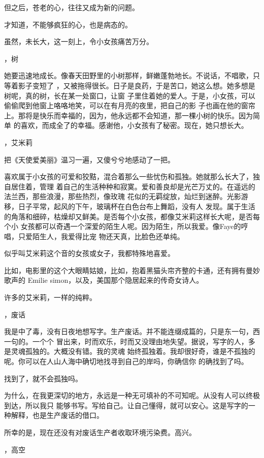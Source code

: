 \documentclass[12pt,a4paper]{article}
\newcommand{\subpart}[1]{
	\begingroup \par
	\vspace{1ex} \centering #1
	\par \endgroup \nopagebreak[4]
}
\begin{document}
		但之后，苍老的心，往往又成为新的问题。

		才知道，不能够疯狂的心，也是病态的。

		虽然，未长大，这一刻上，令小女孩痛苦万分。


		\subpart{2，树}

		她要迅速地成长。像春天田野里的小树那样，鲜嫩蓬勃地长。不说话，不唱歌，只等着影子变短了
	，又被拖得很长。日子是良药，于是苦口，她这么想。她多想是树呢，真的树，长在某一处窗口，让窗
	子里住着她的爱人。于是，小女孩，可以偷偷爬到他窗上咯咯地笑，可以在有月亮的夜里，把自己的影
	子也画在他的窗帘上。那将是快乐而幸福的，因为，他永远都不会知道，那一棵小树的快乐。因为简单
	的喜欢，而成全了的幸福。感谢他，小女孩有了秘密。现在，她只想长大。


		\subpart{3，艾米莉}

		把《天使爱美丽》温习一遍，又傻兮兮地感动了一把。

		喜欢属于小女孩的可爱和狡黠，混合着那么一些忧伤和孤独。她就那么长大了，独自居住着，管理
	着自己的生活种种和寂寞。爱和善良却是光芒万丈的。在遥远的法兰西，那些浪漫，那些热烈，像玫瑰
	花似的无羁绽放，灿烂到迷醉。光影游移，日子平常，起风的下午，玻璃杯在白色台布上舞蹈，没有人
	发现。属于生活的角落和细碎，枯燥却又鲜美。是否每个小女孩，都像艾米莉这样长大呢，是否每个小
	女孩都可以奇遇一个深爱的陌生人呢。因为陌生，所以我爱。像Faye的哼唱，只爱陌生人，我爱得比宠
	物还天真，比脸色还单纯。

		似乎叫艾米莉这个音的女孩或女子，我都特殊地喜爱。

		比如，电影里的这个大眼睛姑娘，比如，抱着黑猫头帘齐整的卡通，还有拥有曼妙歌声的 Emilie
	simon，以及，美国那个隐居起来的传奇女诗人。

		许多的艾米莉，一样的纯粹。


		\subpart{4，废话}

		我是中了毒，没有日夜地想写字。生产废话。并不能连缀成篇的，只是东一句，西一句的。一个个
	冒出来，时而欢乐，时而又没理由地失望。据说，写字的人，多是灵魂孤独的。大概没有错。我的灵魂
	始终孤独着。我却很好奇，谁是不孤独的呢。你可以在人山人海中确切地找寻到自己的岸吗，你确信你
	的确找到了吗。

		找到了，就不会孤独吗。

		为什么，在我更深切的地方，永远是一种无可填补的不可知呢。从没有人可以终极到达，所以我只
	能够书写。写给自己。让自己懂得，就可以安心。这是写字的一种解释，也是生产废话的借口。

		所幸的是，现在还没有对废话生产者收取环境污染费。高兴。


		\subpart{5，高空}
\end{document}
